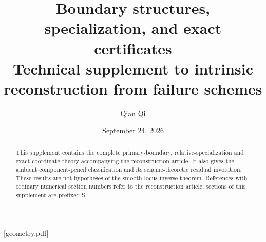 
[geometry.pdf]
\renewcommand{\thesection}{S\arabic{section}}

\title[Boundary structures and exact certificates]{Boundary structures, specialization, and exact certificates\\Technical supplement to intrinsic reconstruction from failure schemes}
\author{Qian Qi}
\date{September 24, 2026}
\begin{abstract}This supplement contains the complete primary-boundary,
relative-specialization and exact-coordinate theory accompanying the
reconstruction article. It also gives the ambient component-pencil
classification and its scheme-theoretic residual involution.
These results are not hypotheses of the smooth-locus inverse theorem.
References with ordinary numerical section numbers refer to the
reconstruction article; sections of this supplement are prefixed S.
\end{abstract}
\maketitle
\enlargethispage{3pt}
\tableofcontents


















